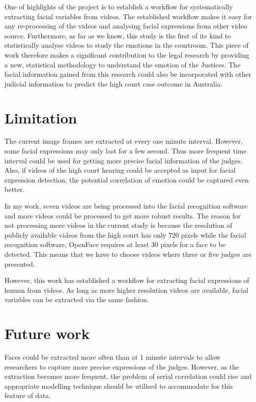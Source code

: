 \documentclass{monashthesis}
\begin{document}
One of highlights of the project is to establish a workflow for systematically extracting facial variables from videos. The established workflow makes it easy for any re-processing of the videos and analysing facial expressions from other video source. Furthermore, as far as we know, this study is the first of its kind to statistically analyse videos to study the emotions in the courtroom. This piece of work therefore makes a significant contribution to the legal research by providing a new, statistical methodology to understand the emotion of the Justices. The facial information gained from this research could also be incorporated with other judicial information to predict the high court case outcome in Australia.

\hypertarget{limitation}{%
\section{Limitation}\label{limitation}}

The current image frames are extracted at every one minute interval. However, some facial expressions may only last for a few second. Thus more frequent time interval could be used for getting more precise facial information of the judges. Also, if videos of the high court hearing could be accepted as input for facial expression detection, the potential correlation of emotion could be captured even better.

In my work, seven videos are being processed into the facial recognition software and more videos could be processed to get more robust results. The reason for not processing more videos in the current study is because the resolution of publicly available videos from the high court has only 720 pixels while the facial recognition software, OpenFace requires at least 30 pixels for a face to be detected. This means that we have to choose videos where three or five judges are presented.

However, this work has established a workflow for extracting facial expressions of human from videos. As long as more higher resolution videos are available, facial variables can be extracted via the same fashion.

\hypertarget{future-work}{%
\section{Future work}\label{future-work}}

Faces could be extracted more often than at 1 minute intervals to allow researchers to capture more precise expressions of the judges. However, as the extraction becomes more frequent, the problem of serial correlation could rise and appropriate modelling technique should be utilised to accommodate for this feature of data.
\end{document}
